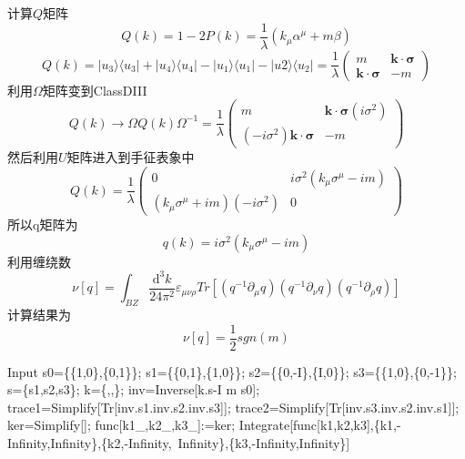 \documentclass[a4paper]{article}
\numberwithin{equation}{subsection}
\begin{document}
计算$Q$矩阵
\begin{equation}
    Q(k)=1-2P(k)=\frac{1}{\lambda}(k_\mu\alpha^\mu+m\beta)
\end{equation}
\begin{equation}
    Q(k)=|u_3\rangle\langle u_3|+|u_4\rangle\langle u_4|-|u_1\rangle\langle u_1|-|u2\rangle\langle u_2|=\frac{1}{\lambda}\begin{pmatrix}
        m&\bm{k}\cdot\bm{\sigma}\\
        \bm{k}\cdot\bm{\sigma}&-m
    \end{pmatrix}
\end{equation}
利用$\Omega$矩阵变到ClassDIII
\begin{equation}
    Q(k)\rightarrow\Omega Q(k)\Omega^{-1}=\frac{1}{\lambda}\begin{pmatrix}
        m&\bm{k}\cdot\bm{\sigma}(i\sigma^2)\\
        (-i\sigma^2)\bm{k}\cdot\bm{\sigma}&-m
    \end{pmatrix}
\end{equation}
然后利用$U$矩阵进入到手征表象中
\begin{equation}
    Q(k)=\frac{1}{\lambda}\begin{pmatrix}
        0&i\sigma^2(k_\mu\sigma^\mu-im)\\
        (k_\mu\sigma^\mu+im)(-i\sigma^2)&0
    \end{pmatrix}
\end{equation}
所以q矩阵为
\begin{equation}
    q(k)=i\sigma^2(k_\mu\sigma^\mu-im)
\end{equation}
利用缠绕数
\begin{equation}
    \nu[q]=\int_{BZ}\frac{\mathrm{d}^3k}{24\pi^2}\varepsilon_{\mu\nu\rho}Tr[(q^{-1}\partial_\mu q)(q^{-1}\partial_\nu q)(q^{-1}\partial_\rho q)]
\end{equation}
计算结果为
\begin{equation}
    \nu[q]=\frac{1}{2}sgn(m)
\end{equation}
\begin{mmaCell}[moredefined={s0, s1, s2, s3, s, k, inv, trace1, \
    trace2, ker, func},morefunctionlocal={k1, k2, k3},morepattern={k1_, \
    k2_, k3_}]{Input}
s0=\{\{1,0\},\{0,1\}\};
s1=\{\{0,1\},\{1,0\}\};
s2=\{\{0,-I\},\{I,0\}\};
s3=\{\{1,0\},\{0,-1\}\};
s=\{s1,s2,s3\};
k=\{,,\};
inv=Inverse[k.s-I m s0];
trace1=Simplify[Tr[inv.s1.inv.s2.inv.s3]];
trace2=Simplify[Tr[inv.s3.inv.s2.inv.s1]];
ker=Simplify[];
func[k1_,k2_,k3_]:=ker;
Integrate[func[k1,k2,k3],\{k1,-Infinity,Infinity\},\{k2,-Infinity,\
Infinity\},\{k3,-Infinity,Infinity\}]
\end{mmaCell}
\end{document}
